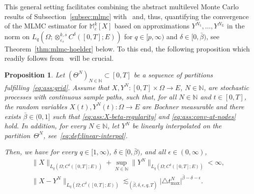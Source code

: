 \documentclass[reqno]{amsart}
\numberwithin{equation}{section}
\newcommand{\bbM}{\mathbb{M}}
\newcommand{\bbN}{\mathbb{N}}
\newcommand{\xkseps}{\otimes^{k,s}_{\varepsilon_s}}
\newcommand{\Mk}{\bbM^k_\varepsilon}
\newcommand{\norm}[2]{     \| #1       \|_{ #2 }}
\newcommand{\from}{\colon}
\newtheorem{proposition}[lemma]{Proposition}
\theoremstyle{remark}
\theoremstyle{definition}
\begin{document}
This general setting facilitates 
combining the abstract 
multilevel Monte Carlo results 
of Subsection~\ref{subsec:mlmc} 
with~\cite[Corollary~2.11]{CoxEtAl2021} 
and, thus, quantifying  
the convergence of the MLMC estimator 
for $\Mk[X]$ based on  
approximations $Y^{N_1}, \ldots, Y^{N_L}$ 
in the norm on 
$L_q(\Omega; \xkseps C^\delta([0,T]; E))$  
for $q\in[p,\infty)$ and $\delta\in[0,\bar{\beta})$, 
see Theorem~\ref{thm:mlmc-hoelder} below. 
%
To this end, the following proposition  
which readily follows  
from~\cite[Corollary~2.11]{CoxEtAl2021}  
will be crucial. 

\begin{proposition}\label{prop:hoelder-conv} 
	Let $(\Theta^N)_{N\in\bbN}\subset [0,T]$ 
	be a sequence of partitions 
	fulfilling~\eqref{eq:ass:grid}. 
	Assume that  
	${X, Y^N \!\from [0,T]\times\Omega \to E}$, 
	$N\in\bbN$, 
	are stochastic processes 
	with continuous sample paths, 
	such that, 
	for all $N\in\bbN$ and $t\in[0,T]$, 
	the random variables 
	$X(t), Y^N\!(t)\from\Omega\to E$  
	are Bochner measurable and 
	there exists $\bar{\beta}\in(0,1]$ 
	such that \eqref{eq:ass:X-beta-regularity} 
	and \eqref{eq:ass:conv-at-nodes} hold. 
	In addition, for every $N\in\bbN$, 
	let $Y^N$ be linearly interpolated on 
	the partition~$\Theta^N$\!, 
	see~\eqref{eq:def:linear-interpol}. 
	
	Then, we have for every $q\in[1,\infty)$, 
	$\delta\in[0,\bar{\beta})$, 
	and all $\epsilon\in(0,\infty)$, 
	\begin{gather*} 
	\norm{X}{L_q(\Omega; C^\delta([0,T];E))} 
	+
	\sup_{N\in\bbN} 
	\bigl\| Y^N \bigr\|_{L_q(\Omega; C^\delta([0,T];E))} 
	<\infty, 
	\\  
	\bigl\| X - Y^N \bigr\|_{L_q(\Omega; C^\delta([0,T];E))} 
	\lesssim_{(\bar{\beta},\delta,\epsilon,q,T)} 
	\bigl|\triangle t^N_{\max} \bigr|^{\bar{\beta} - \delta - \epsilon} 
	\!.  
	\end{gather*} 
\end{proposition}
\end{document}
